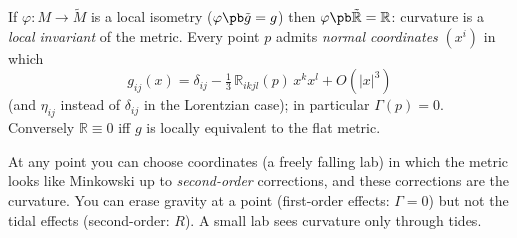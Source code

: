 \begin{formal}
If $\varphi:M\to\tilde M$ is a local isometry ($\varphi\pb\tilde g=g$) then $\varphi\pb\tilde{\mathbb R}=\mathbb R$: curvature is a \emph{local invariant} of the metric. Every point $p$ admits \emph{normal coordinates} $(x^i)$ in which
\[
g_{ij}(x)=\delta_{ij}-\tfrac13\,\mathbb R_{ikjl}(p)\,x^kx^l+O(|x|^3)
\]
(and $\eta_{ij}$ instead of $\delta_{ij}$ in the Lorentzian case); in particular $\Gamma(p)=0$. Conversely $\mathbb R\equiv0$ iff $g$ is locally equivalent to the flat metric.
\end{formal}
\begin{intuition}
At any point you can choose coordinates (a freely falling lab) in which the metric looks like Minkowski up to \emph{second-order} corrections, and these corrections are the curvature. You can erase gravity at a point (first-order effects: $\Gamma=0$) but not the tidal effects (second-order: $R$). A small lab sees curvature only through tides.
\end{intuition}
